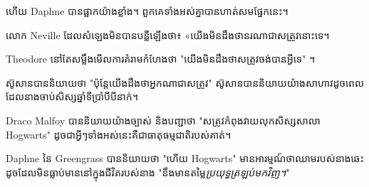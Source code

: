 ហើយ Daphne បានផ្អាកយ៉ាងខ្លាំង។ ពួកគេទាំងអស់គ្នាបានហាត់សមផ្នែកនេះ។

លោក Neville ដែល​សំឡេង​មិន​បាន​បន្លឺ​ឡើង​ថា៖ «យើង​មិន​ដឹង​ថា​នរណា​ជា​សត្រូវ​នោះ​ទេ។

Theodore នៅតែសម្លឹងមើលការគំរាមកំហែងថា "យើងមិនដឹងថាសត្រូវចង់បានអ្វីទេ" ។

ស៊ូសានបាននិយាយថា "ប៉ុន្តែយើងដឹងថាអ្នកណាជាសត្រូវ" ស៊ូសានបាននិយាយយ៉ាងសាហាវដូចពេលដែលនាងចាប់សិស្សឆ្នាំទីប្រាំបីបីនាក់។

Draco Malfoy បាននិយាយយ៉ាងច្បាស់ និងបញ្ជាថា "សត្រូវកំពុងវាយលុកសិស្សសាលា Hogwarts" ដូចជាអ្វីៗទាំងអស់នេះគឺជាធាតុធម្មជាតិរបស់គាត់។

Daphne នៃ Greengrass បាននិយាយថា "ហើយ Hogwarts" មានអារម្មណ៍ថាឈាមរបស់នាងឆេះដូចដែលមិនធ្លាប់មាននៅក្នុងជីវិតរបស់នាង "នឹងមានតម្លៃ\emph{ប្រយុទ្ធត្រឡប់មកវិញ។}"

